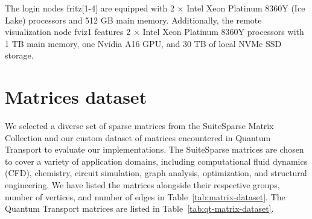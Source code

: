 The login nodes fritz[1-4] are equipped with 2 × Intel Xeon Platinum 8360Y (Ice Lake) processors and 512 GB main memory. Additionally, the remote visualization node fviz1 features 2 × Intel Xeon Platinum 8360Y processors with 1 TB main memory, one Nvidia A16 GPU, and 30 TB of local NVMe SSD storage.





\section{Matrices dataset}

We selected a diverse set of sparse matrices from the SuiteSparse Matrix Collection and our custom dataset of matrices encountered in Quantum Transport to evaluate our implementations. The SuiteSparse matrices are chosen to cover a variety of application domains, including computational fluid dynamics (CFD), chemistry, circuit simulation, graph analysis, optimization, and structural engineering. We have listed the matrices alongside their respective groups, number of vertices, and number of edges in Table~\ref{tab:matrix-dataset}. The Quantum Transport matrices are listed in Table~\ref{tab:qt-matrix-dataset}.

